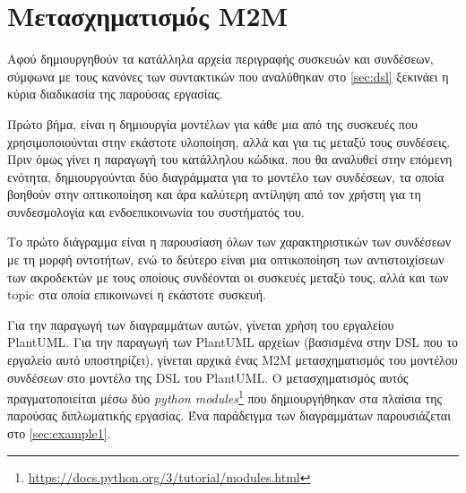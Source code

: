 \section{Μετασχηματισμός M2M}
\label{sec:transformation}

Αφού δημιουργηθούν τα κατάλληλα αρχεία περιγραφής συσκευών και συνδέσεων, σύμφωνα με τους κανόνες των συντακτικών που αναλύθηκαν στο \autoref{sec:dsl} ξεκινάει η κύρια διαδικασία της παρούσας εργασίας.

Πρώτο βήμα, είναι η δημιουργία μοντέλων για κάθε μια από της συσκευές που χρησιμοποιούνται στην εκάστοτε υλοποίηση, αλλά και για τις μεταξύ τους συνδέσεις. Πριν όμως γίνει η παραγωγή του κατάλληλου κώδικα, που θα αναλυθεί στην επόμενη ενότητα, δημιουργούνται δύο διαγράμματα για το μοντέλο των συνδέσεων, τα οποία βοηθούν στην οπτικοποίηση και άρα καλύτερη αντίληψη από τον χρήστη για τη συνδεσμολογία και ενδοεπικοινωνία του συστήματός του.

Το πρώτο διάγραμμα είναι η παρουσίαση όλων των χαρακτηριστικών των συνδέσεων με τη μορφή οντοτήτων, ενώ το δεύτερο είναι μια οπτικοποίηση των αντιστοιχίσεων των ακροδεκτών με τους οποίους συνδέονται οι συσκευές μεταξύ τους, αλλά και των topic στα οποία επικοινωνεί η εκάστοτε συσκευή.

Για την παραγωγή των διαγραμμάτων αυτών, γίνεται χρήση του εργαλείου PlantUML. Για την παραγωγή των PlantUML αρχείων (βασισμένα στην DSL που το εργαλείο αυτό υποστηρίζει), γίνεται αρχικά ένας M2M μετασχηματισμός του μοντέλου συνδέσεων στο μοντέλο της DSL του PlantUML. Ο μετασχηματισμός αυτός πραγματοποιείται μέσω δύο \textit{python modules}\footnote{\url{https://docs.python.org/3/tutorial/modules.html}} που δημιουργήθηκαν στα πλαίσια της παρούσας διπλωματικής εργασίας. Ένα παράδειγμα των διαγραμμάτων παρουσιάζεται στο \autoref{sec:example1}.